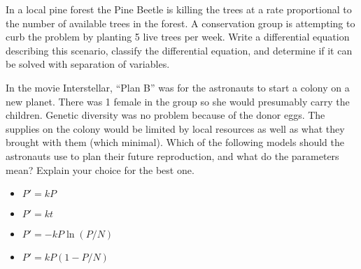 \begin{problem}
    In a local pine forest the Pine Beetle is killing the trees at a rate proportional to the
    number of available trees in the forest.  A conservation group is attempting to curb the
    problem by planting 5 live trees per week.  Write a differential equation describing
    this scenario, classify the differential equation, and determine if it can be solved
    with separation of variables.
\end{problem}


\begin{problem}
    In the movie Interstellar, ``Plan B'' was for the astronauts to start a colony on a new
    planet.  There was 1 female in the group so she would presumably carry the children.
    Genetic diversity was no problem because of the donor eggs.  The supplies on the colony
    would be limited by local resources as well as what they brought with them
    (which minimal).  Which of the following models should the astronauts use to plan
    their future reproduction, and what do the parameters mean?  Explain your choice for the best one.
    \begin{itemize}
        \item $P' = kP$
        \item $P' = kt$
        \item $P' = -kP\ln(P/N)$
        \item $P' = kP(1-P/N) $
    \end{itemize}
\end{problem}


